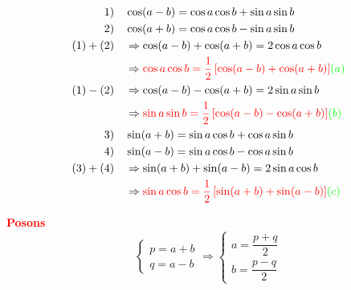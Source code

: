 \documentclass[a4paper,12pt]{article}
\begin{document}
\[
    \begin{aligned}
        \text{1)}\quad & \cos(a - b) = \cos a \cos b + \sin a \sin b                                                                           \\
        \text{2)}\quad & \cos(a + b) = \cos a \cos b - \sin a \sin b                                                                           \\
        (1) + (2)\quad & \Rightarrow \cos(a - b) + \cos(a + b) = 2\cos a \cos b                                                                \\
        \quad          & \Rightarrow \textcolor{red}{\cos a \cos b = \frac{1}{2}\left[\cos(a - b) + \cos(a + b)\right]} \textcolor{green}{(a)} \\
        (1) - (2)\quad & \Rightarrow \cos(a - b) - \cos(a + b) = 2\sin a \sin b                                                                \\
        \quad          & \Rightarrow \textcolor{red}{\sin a \sin b = \frac{1}{2}\left[\cos(a - b) - \cos(a + b)\right]} \textcolor{green}{(b)} \\
        \text{3)}\quad & \sin(a + b) = \sin a \cos b + \cos a \sin b                                                                           \\
        \text{4)}\quad & \sin(a - b) = \sin a \cos b - \cos a \sin b                                                                           \\
        (3) + (4)\quad & \Rightarrow \sin(a + b) + \sin(a - b) = 2\sin a \cos b                                                                \\
        \quad          & \Rightarrow \textcolor{red}{\sin a \cos b = \frac{1}{2}\left[\sin(a + b) + \sin(a - b)\right]} \textcolor{green}{(c)}
    \end{aligned}
\]


\medskip

\noindent\textbf{\textcolor{red}{Posons}}
\[
    \left\{
    \begin{array}{l}
        p = a + b \\
        q = a - b
    \end{array}
    \right.
    \Rightarrow
    \left\{
    \begin{array}{l}
        a = \dfrac{p + q}{2} \\
        b = \dfrac{p - q}{2}
    \end{array}
    \right.
\]
\end{document}
